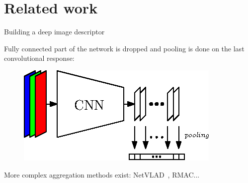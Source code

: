 \section{Related work}

\label{sec:related_work}

\begin{frame}{Building a deep image descriptor}

	Fully connected part of the network is dropped and pooling is done on the last convolutional response:
	\vfill
	\begin{figure}
		\centering
		\includegraphics[width=0.8\linewidth]{vect/MAC.eps}			
	\end{figure}
	\vfill
	More complex aggregation methods exist: NetVLAD~\cite{Arandjelovic2017}, RMAC...
\end{frame}

